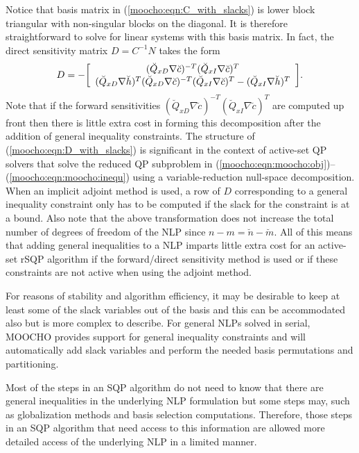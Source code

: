 \documentclass[pdf,12pt,report]{SANDreport}
\begin{document}
Notice that basis matrix in (\ref{moocho:eqn:C_with_slacks}) is lower block
triangular with non-singular blocks on the diagonal.  It is therefore straightforward to solve
for linear systems with this basis matrix.  In fact, the direct sensitivity matrix
$D = C^{-1} N$ takes the form
%
\begin{equation}
D = - {\bmat{c}
	( \breve{Q}_{xD} \nabla \breve{c} )^{-T} ( \breve{Q}_{xI} \nabla \breve{c} )^{T} \\
    ( \breve{Q}_{xD} \nabla \breve{h} )^T ( \breve{Q}_{xD} \nabla \breve{c} )^{-T} ( \breve{Q}_{xI} \nabla \breve{c} )^{T}
      -( \breve{Q}_{xI} \nabla \breve{h} )^T
\emat}.
\label{moocho:eqn:D_with_slacks}
\end{equation}
%
Note that if the forward sensitivities $( \breve{Q}_{xD} {}\nabla {}\breve{c}
)^{-T} ( \breve{Q}_{xI} {}\nabla {}\breve{c} )^{T}$ are computed up front then
there is little extra cost in forming this decomposition after the addition of
general inequality constraints.  The structure of
(\ref{moocho:eqn:D_with_slacks}) is significant in the context of active-set
QP solvers that solve the reduced QP subproblem in
(\ref{moocho:eqn:moocho:obj})--(\ref{moocho:eqn:moocho:inequ}) using a
variable-reduction null-space decomposition.  When an implicit adjoint method
is used, a row of $D$ corresponding to a general inequality constraint only
has to be computed if the slack for the constraint is at a bound.  Also note
that the above transformation does not increase the total number of degrees of
freedom of the NLP since $n-m = {}\breve{n}-\breve{m}$.  All of this means
that adding general inequalities to a NLP imparts little extra cost for an
active-set rSQP algorithm if the forward/direct sensitivity method is used or
if these constraints are not active when using the adjoint method.

For reasons of stability and algorithm efficiency, it may be desirable to keep
at least some of the slack variables out of the basis and this can be
accommodated also but is more complex to describe.  For general NLPs solved in
serial, MOOCHO provides support for general inequality constraints and will
automatically add slack variables and perform the needed basis permutations
and partitioning.

Most of the steps in an SQP algorithm do not need to know that there are
general inequalities in the underlying NLP formulation but some steps may,
such as globalization methods and basis selection computations.  Therefore,
those steps in an SQP algorithm that need access to this information are
allowed more detailed access of the underlying NLP in a limited manner.
\end{document}
